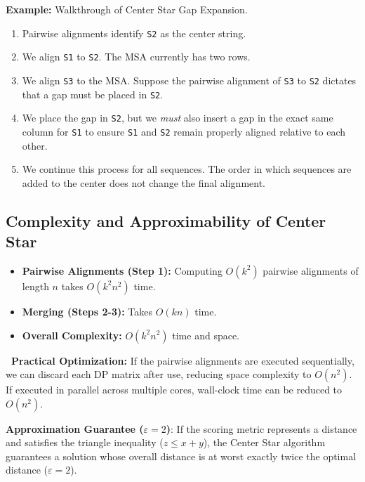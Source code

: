 \documentclass[11pt, a4paper]{article}
\newcommand{\sta}{\textbf{\sffamily [CRITICAL / EXAM]\ }}
\newenvironment{important}
  {\begin{tcolorbox}[colback=blue!5!white, colframe=blue!75!black, arc=1mm, boxrule=1pt]}
  {\end{tcolorbox}}
\begin{document}
\textbf{Example:} Walkthrough of Center Star Gap Expansion.
\begin{enumerate}
    \item Pairwise alignments identify \texttt{S2} as the center string.
    \item We align \texttt{S1} to \texttt{S2}. The MSA currently has two rows.
    \item We align \texttt{S3} to the MSA. Suppose the pairwise alignment of \texttt{S3} to \texttt{S2} dictates that a gap must be placed in \texttt{S2}.
    \item We place the gap in \texttt{S2}, but we \textit{must} also insert a gap in the exact same column for \texttt{S1} to ensure \texttt{S1} and \texttt{S2} remain properly aligned relative to each other.
    \item We continue this process for all sequences. The order in which sequences are added to the center does not change the final alignment.
\end{enumerate}

\subsection{Complexity and Approximability of Center Star}

\begin{itemize}
    \item \textbf{Pairwise Alignments (Step 1):} Computing $O(k^2)$ pairwise alignments of length $n$ takes $O(k^2 n^2)$ time.
    \item \textbf{Merging (Steps 2-3):} Takes $O(k n)$ time.
    \item \textbf{Overall Complexity:} $O(k^2 n^2)$ time and space.
\end{itemize}

\sta \textbf{Practical Optimization:} If the pairwise alignments are executed sequentially, we can discard each DP matrix after use, reducing space complexity to $O(n^2)$. If executed in parallel across multiple cores, wall-clock time can be reduced to $O(n^2)$.

\begin{important}
  \textbf{Approximation Guarantee ($\varepsilon = 2$)}: If the scoring metric represents a distance and satisfies the triangle inequality ($z \le x + y$), the Center Star algorithm guarantees a solution whose overall distance is at worst exactly twice the optimal distance ($\varepsilon = 2$).
\end{important}
\end{document}
